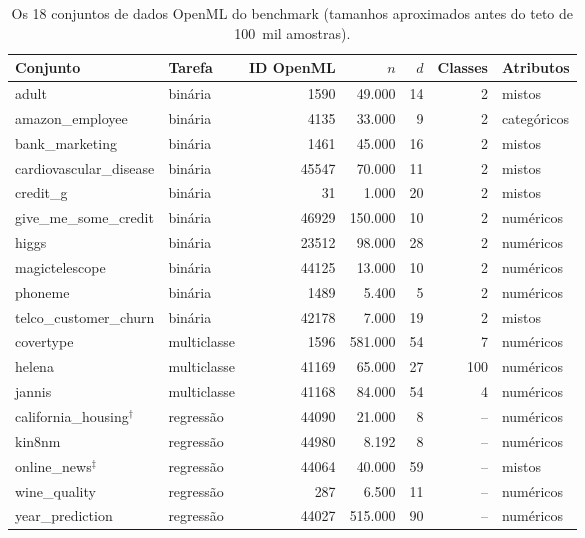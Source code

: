 \begin{table}[htbp]
\centering
\caption[Os 18 conjuntos de dados do benchmark]{Os 18 conjuntos de dados OpenML do benchmark (tamanhos aproximados
antes do teto de 100~mil amostras).}
\label{tab:datasets}
\small
\begin{tabular}{llrrrrl}
\toprule
Conjunto & Tarefa & ID OpenML & $n$ & $d$ & Classes & Atributos \\
\midrule
adult                   & binária & 1590  & 49.000  & 14 & 2 & mistos \\
amazon\_employee        & binária & 4135  & 33.000  & 9  & 2 & categóricos \\
bank\_marketing         & binária & 1461  & 45.000  & 16 & 2 & mistos \\
cardiovascular\_disease & binária & 45547 & 70.000  & 11 & 2 & mistos \\
credit\_g               & binária & 31    & 1.000   & 20 & 2 & mistos \\
give\_me\_some\_credit  & binária & 46929 & 150.000 & 10 & 2 & numéricos \\
higgs                   & binária & 23512 & 98.000  & 28 & 2 & numéricos \\
magictelescope          & binária & 44125 & 13.000  & 10 & 2 & numéricos \\
phoneme                 & binária & 1489  & 5.400   & 5  & 2 & numéricos \\
telco\_customer\_churn  & binária & 42178 & 7.000   & 19 & 2 & mistos \\
\midrule
covertype               & multiclasse & 1596  & 581.000 & 54 & 7   & numéricos \\
helena                  & multiclasse & 41169 & 65.000  & 27 & 100 & numéricos \\
jannis                  & multiclasse & 41168 & 84.000  & 54 & 4   & numéricos \\
\midrule
california\_housing$^{\dagger}$ & regressão & 44090 & 21.000  & 8  & -- & numéricos \\
kin8nm                  & regressão & 44980 & 8.192   & 8  & -- & numéricos \\
online\_news$^{\ddagger}$ & regressão & 44064 & 40.000  & 59 & -- & mistos \\
wine\_quality           & regressão & 287   & 6.500   & 11 & -- & numéricos \\
year\_prediction        & regressão & 44027 & 515.000 & 90 & -- & numéricos \\
\bottomrule
\end{tabular}
\end{table}


